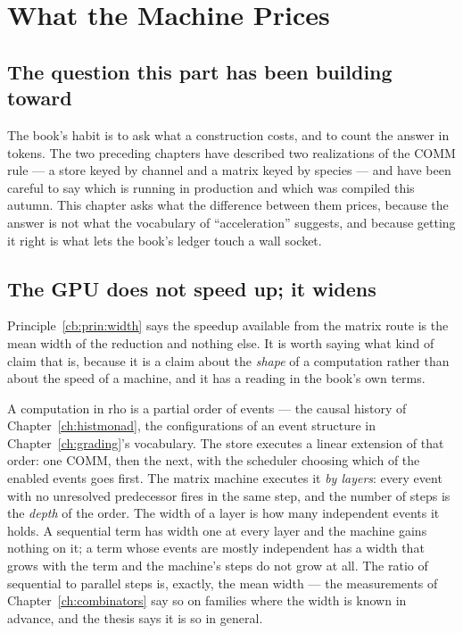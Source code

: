 \chapter{What the Machine Prices}
\label{ch:price}

\section{The question this part has been building toward}

The book's habit is to ask what a construction costs, and to count the answer in tokens.
The two preceding chapters have described two realizations of the COMM rule --- a store
keyed by channel and a matrix keyed by species --- and have been careful to say which is
running in production and which was compiled this autumn. This chapter asks what the
difference between them prices, because the answer is not what the vocabulary of
``acceleration'' suggests, and because getting it right is what lets the book's ledger
touch a wall socket.

\section{The GPU does not speed up; it widens}
\label{pr:sec:widen}

Principle~\ref{cb:prin:width} says the speedup available from the matrix route is the
mean width of the reduction and nothing else. It is worth saying what kind of claim that is,
because it is a claim about the \emph{shape} of a computation rather than about the speed of
a machine, and it has a reading in the book's own terms.

A computation in rho is a partial order of events --- the causal history of
Chapter~\ref{ch:histmonad}, the configurations of an event structure in
Chapter~\ref{ch:grading}'s vocabulary. The store executes a linear extension of that
order: one COMM, then the next, with the scheduler choosing which of the enabled events
goes first. The matrix machine executes it \emph{by layers}: every event with no
unresolved predecessor fires in the same step, and the number of steps is the \emph{depth}
of the order. The width of a layer is how many independent events it holds. A sequential
term has width one at every layer and the machine gains nothing on it; a term whose
events are mostly independent has a width that grows with the term and the machine's
steps do not grow at all. The ratio of sequential to parallel steps is, exactly, the mean
width --- the measurements of Chapter~\ref{ch:combinators} say so on families where the
width is known in advance, and the thesis says it is so in general.

